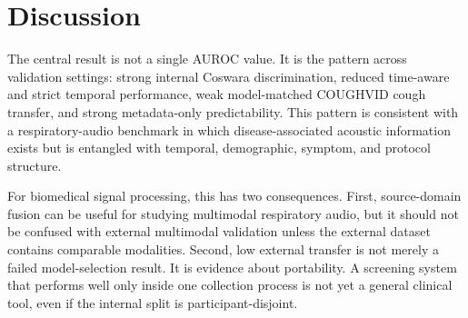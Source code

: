 \documentclass[preprint,12pt]{elsarticle}
\begin{document}
\begin{table}[t]
\centering
\caption{Representative non-final model branches. These rows document model-development breadth and support the interpretation that reliability limits were not solved simply by switching to spectrogram CNN/BiGRU or practical WavLM embeddings.}
\label{tab:negative_branches}
\end{table}

\section{Discussion}

The central result is not a single AUROC value. It is the pattern across validation settings: strong internal Coswara discrimination, reduced time-aware and strict temporal performance, weak model-matched COUGHVID cough transfer, and strong metadata-only predictability. This pattern is consistent with a respiratory-audio benchmark in which disease-associated acoustic information exists but is entangled with temporal, demographic, symptom, and protocol structure.

For biomedical signal processing, this has two consequences. First, source-domain fusion can be useful for studying multimodal respiratory audio, but it should not be confused with external multimodal validation unless the external dataset contains comparable modalities. Second, low external transfer is not merely a failed model-selection result. It is evidence about portability. A screening system that performs well only inside one collection process is not yet a general clinical tool, even if the internal split is participant-disjoint.
\end{document}

